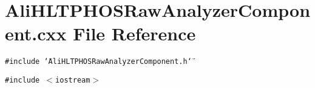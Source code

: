 \section{Ali\-HLTPHOSRaw\-Analyzer\-Component.cxx File Reference}
\label{AliHLTPHOSRawAnalyzerComponent_8cxx}


{\tt \#include \char`\"{}Ali\-HLTPHOSRaw\-Analyzer\-Component.h\char`\"{}}\par
{\tt \#include $<$iostream$>$}\par
